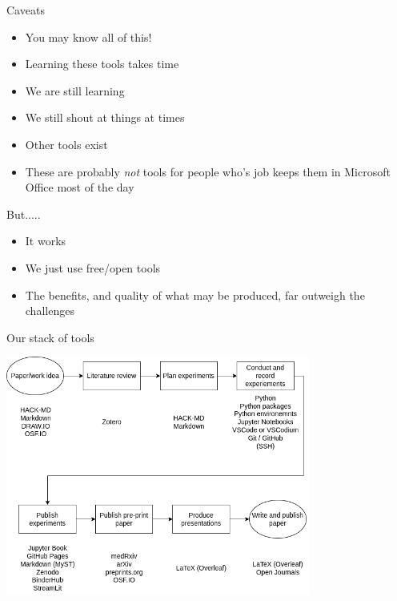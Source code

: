 \documentclass[xcolor={usenames,dvipsnames}]{beamer}
\begin{document}
\begin{frame}{Caveats}

\begin{itemize}
    \setlength\itemsep{1mm}
    \item You may know all of this!
    \item Learning these tools takes time
    \item We are still learning
    \item We still shout at things at times
    \item Other tools exist
    \item These are probably \emph{not} tools for people who's job keeps them in Microsoft Office most of the day
\end{itemize}

\vspace{2mm}
But.....
\vspace{2mm}

\begin{itemize}
    \setlength\itemsep{1mm}
    \item It works
    \item We just use free/open tools
    \item The benefits, and quality of what may be produced, far outweigh the challenges
\end{itemize}

\end{frame}


\begin{frame}{Our stack of tools}


\begin{center}
\includegraphics[width=0.75\textwidth]{./images/open_science-2}
\end{center}

\end{frame}
\end{document}
